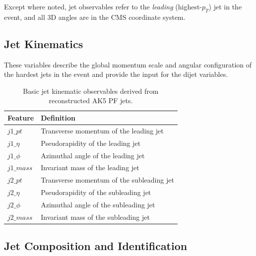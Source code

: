 \documentclass[11pt,a4paper,twocolumn]{article}
\begin{document}
Except where noted, jet observables refer to the \emph{leading} (highest-$p_T$) jet in the event, and all 3D angles are in the CMS coordinate system.

\subsection{Jet Kinematics}
These variables describe the global momentum scale and angular configuration of the hardest jets in the event and provide the input for the dijet variables.

\begin{table}[h]
\centering
\caption{Basic jet kinematic observables derived from reconstructed AK5 PF jets.}
\footnotesize

\begin{tabular}{ll}
\toprule
Feature & Definition \\
\midrule
$j1\_pt$   & Transverse momentum of the leading jet \\
$j1\_\eta$ & Pseudorapidity of the leading jet \\
$j1\_\phi$ & Azimuthal angle of the leading jet \\
$j1\_mass$ & Invariant mass of the leading jet \\
$j2\_pt$   & Transverse momentum of the subleading jet \\
$j2\_\eta$ & Pseudorapidity of the subleading jet \\
$j2\_\phi$ & Azimuthal angle of the subleading jet \\
$j2\_mass$ & Invariant mass of the subleading jet \\
\bottomrule
\end{tabular}

\end{table}

\subsection{Jet Composition and Identification}
\end{document}
